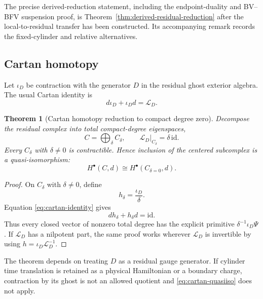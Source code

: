 \documentclass[11pt]{article}
\newtheorem{theorem}{Theorem}[section]
\theoremstyle{definition}
\theoremstyle{remark}
\newcommand{\cL}{\mathcal L}
\newcommand{\id}{\mathrm{id}}
\begin{document}
The precise derived-reduction statement, including the endpoint-duality and
BV--BFV suspension proof, is Theorem~\ref{thm:derived-residual-reduction}
after the local-to-residual transfer has been constructed.  Its accompanying
remark records the fixed-cylinder and relative alternatives.

\subsection{Cartan homotopy}

Let $\iota_D$ be contraction with the generator $D$ in the residual ghost
exterior algebra.  The usual Cartan identity is
\begin{equation}\label{eq:cartan-identity}
 d\iota_D+\iota_Dd=\cL_D.
\end{equation}

\begin{theorem}[Cartan homotopy reduction to compact degree zero]\label{thm:cartan}
Decompose the residual complex into total compact-degree eigenspaces,
\begin{equation}
 C=\bigoplus_{\delta}C_\delta,
 \qquad \cL_D|_{C_\delta}=\delta\,\id.
\end{equation}
Every $C_\delta$ with $\delta\ne0$ is contractible.  Hence inclusion of the
centered subcomplex is a quasi-isomorphism:
\begin{equation}\label{eq:cartan-quasiiso}
 \boxed{H^\bullet(C,d)\cong H^\bullet(C_{\delta=0},d).}
\end{equation}
\end{theorem}

\begin{proof}
On $C_\delta$ with $\delta\ne0$, define
\begin{equation}
 h_\delta=\frac{\iota_D}{\delta}.
\end{equation}
Equation \eqref{eq:cartan-identity} gives
\begin{equation}
 dh_\delta+h_\delta d=\id.
\end{equation}
Thus every closed vector of nonzero total degree has the explicit primitive
$\delta^{-1}\iota_D\Psi$.  If $\cL_D$ has a nilpotent part, the same proof
works wherever $\cL_D$ is invertible by using
$h=\iota_D\cL_D^{-1}$.
\end{proof}

The theorem depends on treating $D$ as a residual gauge generator.  If
cylinder time translation is retained as a physical Hamiltonian or a
boundary charge, contraction by its ghost is not an allowed quotient and
\eqref{eq:cartan-quasiiso} does not apply.
\end{document}
